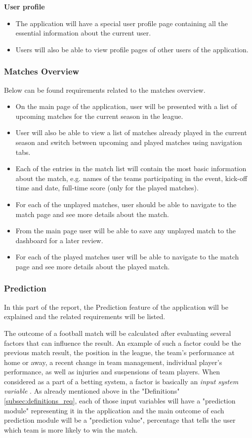 \textbf{User profile}
\begin{itemize}
	\item The application will have a special user profile page containing all the essential information about the current user.
	\item Users will also be able to view profile pages of other users of the application.
\end{itemize}

\subsubsection{Matches Overview}
\label{subsubsec:matchesoverview_req}
Below can be found requirements related to the matches overview.
\begin{itemize}
	\item On the main page of the application, user will be presented with a list of upcoming matches for the current season in the league.
   \item User will also be able to view a list of matches already played in the current season and switch between upcoming and played matches using navigation tabs.
  \item Each of the entries in the match list will contain the most basic information about the match, e.g. names of the teams participating in the event, kick-off time and date, full-time score (only for the played matches).
  \item For each of the unplayed matches, user should be able to navigate to the match page and see more details about the match.
 	\item From the main page user will be able to save any unplayed match to the dashboard for a later review.
 	\item For each of the played matches user will be able to navigate to the match page and see more details about the played match.
\end{itemize}

\subsubsection{Prediction}
\label{subsubsec:prediction_req}
In this part of the report, the Prediction feature of the application will be explained and the related requirements will be listed.

The outcome of a football match will be calculated after evaluating several factors that can influence the result. An example of such a factor could be the previous match result, the position in the league, the team’s performance at home or away, a recent change in team management, individual player’s performance, as well as injuries and suspensions of team players. When considered as a part of a betting system, a factor is basically an \emph{input system variable} \citep{art:simplebettingsystem}. As already mentioned above in the "Definitions" \ref{subsec:definitions_req}, each of those input variables will have a "prediction module" representing it in the application and the main outcome of each prediction module will be a "prediction value", percentage that tells the user which team is more likely to win the match.

